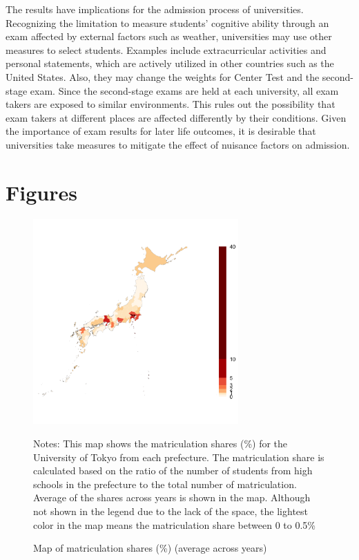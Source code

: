\documentclass[12pt,letterpaper]{article}
\begin{document}
The results have implications for the admission process of universities.
Recognizing the limitation to measure students' cognitive ability through an exam affected by external factors such as weather, universities may use other measures to select students.
Examples include extracurricular activities and personal statements, which are actively utilized in other countries such as the United States.
Also, they may change the weights for Center Test and the second-stage exam.
Since the second-stage exams are held at each university, all exam takers are exposed to similar environments.
This rules out the possibility that exam takers at different places are affected differently by their conditions.
Given the importance of exam results for later life outcomes, it is desirable that universities take measures to mitigate the effect of nuisance factors on admission.

\clearpage



\section{Figures}

\begin{figure}[H]
  \centering
  \caption{Map of matriculation shares (\%) (average across years)}
  \includegraphics[width = 0.7\textwidth]{../Output/images/admission_map.png}
  \label{fig:admission_map}
  \footnotesize
  \begin{tablenotes}
    \item Notes:
      This map shows the matriculation shares (\%) for the University of Tokyo from each prefecture.
      The matriculation share is calculated based on the ratio of the number of students from high schools in the prefecture to the total number of matriculation.
      Average of the shares across years is shown in the map.
      Although not shown in the legend due to the lack of the space, the lightest color in the map means the matriculation share between 0 to 0.5\% 
  \end{tablenotes}
\end{figure}
\end{document}
